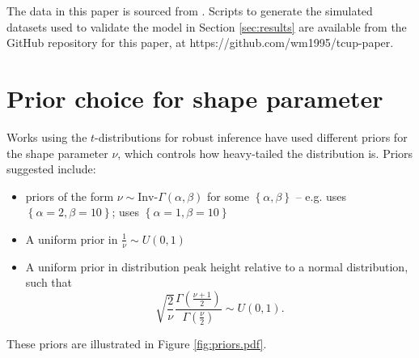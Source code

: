 \documentclass[fleqn,usenatbib]{mnras}
\begin{document}
The data in this paper is sourced from \citet{Kelly:2007, Park:2017}. Scripts to
generate the simulated datasets used to validate the model in Section
\ref{sec:results} are available from the GitHub repository for this paper, at
https://github.com/wm1995/tcup-paper.







\appendix

\section{Prior choice for shape parameter}

Works using the $t$-distributions for robust inference have used different
priors for the shape parameter $\nu$, which controls how heavy-tailed the
distribution is. Priors suggested include:
\begin{itemize}
    \item priors of the form $\nu \sim \text{Inv-}\Gamma(\alpha, \beta)$ for
          some $\left\{\alpha, \beta\right\}$ -- e.g.
          \citet{Juarez:2010} uses $\left\{\alpha = 2, \beta = 10\right\}$;
          \citet{Ding:2014} uses $\left\{\alpha = 1, \beta = 10\right\}$
    \item A uniform prior in $\frac1\nu \sim U(0, 1)$ \citep{Gelman:2013}
    \item A uniform prior in distribution peak height relative to a normal
    distribution, such that
    \begin{equation}
        \sqrt{\frac2\nu}\frac{\Gamma\left(\frac{\nu + 1}{2}\right)}{\Gamma\left(\frac{\nu}{2}\right)} \sim U(0, 1).
    \end{equation}
\end{itemize}
These priors are illustrated in Figure \ref{fig:priors.pdf}.
\end{document}
